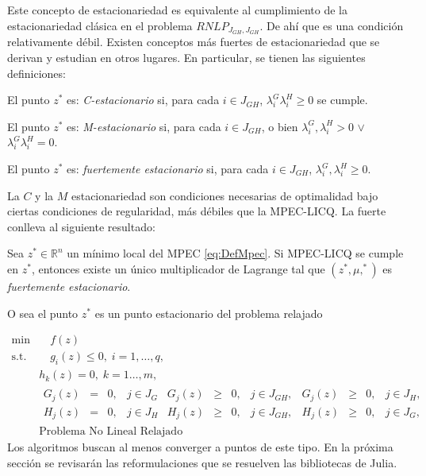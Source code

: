 Este concepto de estacionariedad es equivalente al cumplimiento de la estacionariedad cl\'asica en el problema $RNLP_{J_{GH},J_{GH}}$. De ah\'i que  es una condición relativamente débil. Existen conceptos más fuertes de estacionariedad que se derivan y estudian en otros lugares. En particular, se tienen las siguientes definiciones:


 \begin{definition}
  El punto $z^*$ es: \textit{C-estacionario} si, para cada $i \in J_{GH}$, $\lambda_i^G\lambda_i^H \geq 0$ se cumple.
\end{definition}
\begin{definition}
    El punto $z^*$ es: \textit{M-estacionario} si, para cada $i \in J_{GH}$, o bien $\lambda_i^G,\lambda_i^H > 0$ $\vee$ $\lambda_i^G \lambda_i^H = 0$.
\end{definition}
 \begin{definition}
    El punto $z^*$ es: \textit{fuertemente estacionario}  si, para cada $i \in J_{GH}$, $\lambda_i^G, \lambda_i^H \geq 0$.
\end{definition}

La $C$ y la $M$ estacionariedad  son condiciones necesarias de optimalidad bajo ciertas condiciones de regularidad, m\'as d\'ebiles que la  MPEC-LICQ. La fuerte conlleva al siguiente resultado:
\begin{theorem} 
Sea $z^* \in \mathbb{R}^n$ un mínimo local del MPEC \eqref{eq:DefMpec}. Si MPEC-LICQ se cumple en $z^*$, entonces existe un único multiplicador de Lagrange  tal que $(z^*, \mu, ^*)$ es \textit{fuertemente estacionario}.
\end{theorem}
O sea el punto $z^*$ es un punto estacionario del problema relajado 

\begin{equation}
\begin{array}{cl}
\min  &\quad  f(z)  \\
\text{s.t.} &\quad  g_i(z) \leq 0, \;i=1,\ldots,q, \\ &h_k(z) = 0,\;k=1\ldots,m, \\
&\begin{array}{ccccccccccccccccc}G_j(z) &=& 0, & j\in J_G& G_j(z) &\geq& 0, &j\in J_{GH},& G_j(z) &\geq& 0, & j\in J_H,\\ 
H_j(z) &=& 0, & j\in J_H& H_j(z) &\geq& 0, & j\in J_{GH},& H_j(z) &\geq& 0, & j\in J_G,\end{array}\\
& \text{Problema No Lineal Relajado }  
\end{array}
\label{eRNLP}
\end{equation}Los algoritmos buscan al menos converger a puntos de este tipo.  En la pr\'oxima secci\'on se revisar\'an las reformulaciones que se resuelven  las bibliotecas de Julia.
